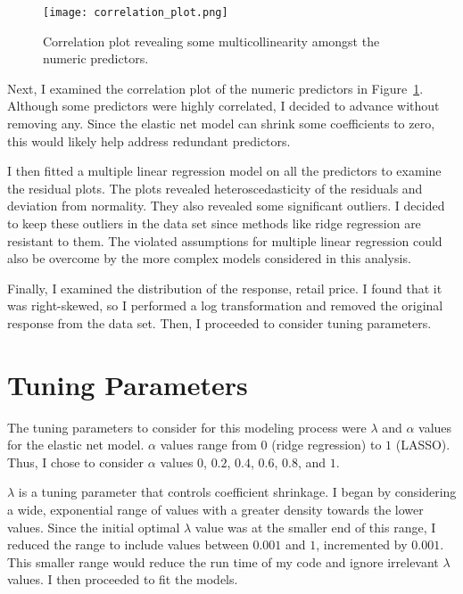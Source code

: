 \documentclass{article}
\begin{document}
\begin{figure}
    \centering
    \texttt{[image: correlation\_plot.png]}
    \caption{Correlation plot revealing some multicollinearity amongst the numeric predictors.}
    \label{fig:corrplot}
\end{figure}

Next, I examined the correlation plot of the numeric predictors in Figure~\ref{fig:corrplot}.  Although 
some predictors were highly correlated, I decided to advance without removing any.  Since the elastic 
net model can shrink some coefficients to zero, this would likely help address redundant predictors. 

I then fitted a multiple linear regression model on all the predictors to examine the residual plots.  
The plots revealed heteroscedasticity of the residuals and deviation from normality.  They also revealed 
some significant outliers.  I decided to keep these outliers in the data set since methods like ridge 
regression are resistant to them.  The violated assumptions for multiple linear regression could also be 
overcome by the more complex models considered in this analysis.

Finally, I examined the distribution of the response, retail price.  I found that it was right-skewed, 
so I performed a log transformation and removed the original response from the data set.  Then, I 
proceeded to consider tuning parameters.  

\section{Tuning Parameters}

The tuning parameters to consider for this modeling process were $\lambda$ and $\alpha$ values for the 
elastic net model. 
 $\alpha$ values range from $0$ (ridge regression) to $1$ (LASSO).  Thus, I chose to consider $\alpha$ 
 values $0$, $0.2$, $0.4$, $0.6$, $0.8$, and $1$.  
 
 $\lambda$ is a tuning parameter that controls coefficient shrinkage. I began by considering a wide, 
 exponential range of values with a greater density towards the lower values.  Since the initial 
 optimal $\lambda$ value was at the smaller end of this range, I reduced the range to include values 
 between $0.001$ and $1$, incremented by $0.001$.  This smaller range would reduce the run time of my 
 code and ignore irrelevant $\lambda$ values.  I then proceeded to fit the models.  
\end{document}
